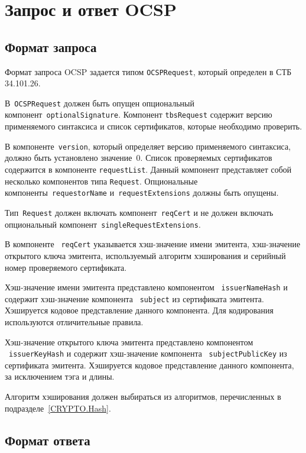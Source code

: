\section{Запрос и ответ OCSP}\label{FMT.OCSP}

\subsection{Формат запроса}

Формат запроса OCSP задается типом \texttt{OCSPRequest}, который определен 
в СТБ 34.101.26. 

В~\texttt{OCSPRequest} должен быть опущен опциональный 
компонент~\texttt{optionalSignature}. Компонент \texttt{tbsRequest} содержит 
версию применяемого синтаксиса и список сертификатов, которые необходимо 
проверить.

В компоненте~\texttt{version}, который определяет версию применяемого 
синтаксиса, должно быть установлено значение~$0$.
Список проверяемых сертификатов содержится в компоненте
\texttt{requestList}. Данный компонент представляет собой 
несколько компонентов типа \texttt{Request}. Опциональные 
компоненты~\texttt{requestorName} и~\texttt{requestExtensions} должны быть 
опущены. 

Тип~\texttt{Request} должен включать компонент~\texttt{reqCert} и 
не должен включать опциональный компонент~\texttt{singleRequestExtensions}.

В компоненте ~\texttt{reqCert} указывается хэш-значение имени эмитента, 
хэш-значение открытого ключа эмитента, используемый алгоритм 
хэширования и серийный номер проверяемого сертификата.

Хэш-значение имени эмитента представлено компонентом ~\texttt{issuerNameHash} 
и содержит хэш-значение компонента ~\texttt{subject} из сертификата 
эмитента. Хэшируется кодовое представление данного компонента. Для кодирования 
используются отличительные правила.

Хэш-значение открытого ключа эмитента представлено компонентом 
~\texttt{issuerKeyHash} и содержит хэш-значение компонента 
~\texttt{subjectPublicKey} из сертификата 
эмитента. Хэшируется кодовое представление данного компонента, за 
исключением тэга и длины.

Алгоритм хэширования должен выбираться из алгоритмов, перечисленных в 
подразделе~\ref{CRYPTO.Hash}.

\subsection{Формат ответа}

